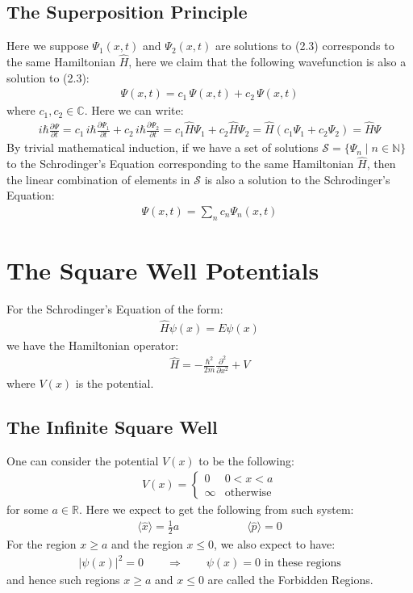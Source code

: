 \documentclass[11pt]{book}
\theoremstyle{break}
\theoremstyle{break}
\newcommand{\R}{\mathbb{R}}
\newcommand{\N}{\mathbb{N}}
\newcommand{\C}{\mathbb{C}}
\newcommand{\pd}{\partial}
\begin{document}
\subsection{The Superposition Principle}
Here we suppose $\Psi_1(x,t)$ and $\Psi_2(x,t)$ are solutions to (2.3) corresponds to the same Hamiltonian $\hat{H}$, here we claim that the following wavefunction is also a solution to (2.3):
\begin{align*}
\Psi(x,t) = c_1\, \Psi(x,t) + c_2\, \Psi(x,t)
\end{align*}
where $c_1,c_2 \in \C$. Here we can write:
\begin{align*}
i\hbar \frac{\pd \Psi}{\pd t} =c_1\, i\hbar \frac{\pd \Psi_1}{\pd t} +c_2\, i\hbar \frac{\pd \Psi_2}{\pd t} = c_1 \hat{H}\Psi_1 + c_2 \hat{H}\Psi_2 =\hat{H}(c_1 \Psi_1+c_2 \Psi_2) =\hat{H}\Psi
\end{align*}
By trivial mathematical induction, if we have a set of solutions $\mathcal{S} =\{\Psi_n \mid n \in \N\}$ to the Schrodinger's Equation corresponding to the same Hamiltonian $\hat{H}$, then the linear combination of elements in $\mathcal{S}$ is also a solution to the Schrodinger's Equation:
\begin{align*}
\Psi(x,t) = \sum_{n}c_n \Psi_n(x,t)
\end{align*}

\newpage
\section[The Square Well Potentials]{\color{red} The Square Well Potentials\color{black}}
For the Schrodinger's Equation of the form:
\begin{align*}
\hat{H}\psi(x) = E\psi(x)
\end{align*}
we have the Hamiltonian operator:
\begin{align*}
\hat{H} = -\frac{\hbar^2}{2m}\frac{\pd^2}{\pd x^2} +V
\end{align*}
where $V(x)$ is the potential. 
\subsection{The Infinite Square Well}
One can consider the potential $V(x)$ to be the following:
\begin{align}
V(x) = \begin{cases} 
0 & 0<x<a\\
\infty & \text{otherwise}
\end{cases}
\end{align}
for some $a \in \R$. Here we expect to get the following from such system:
\begin{align*}
\langle \hat{x} \rangle = \frac{1}{2}a \qquad\qquad\qquad \langle \hat{p}\rangle = 0
\end{align*}
For the region $x\geq a$ and the region $x\leq 0$, we also expect to have:
\begin{align}
|\psi(x)|^2 = 0 \qquad \Rightarrow \qquad \psi(x) = 0 \text{ in these regions}
\end{align}
and hence such regions $x\geq a$ and $x\leq 0$ are called the Forbidden Regions.\\
\end{document}
